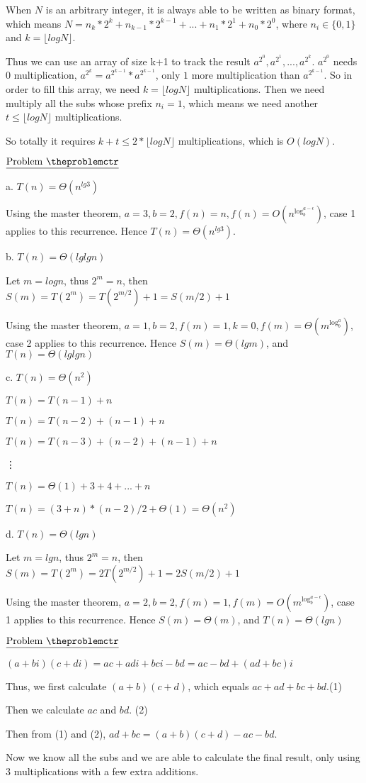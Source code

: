 \documentclass[11pt]{article}
\def\pp{\par\noindent}
\begin{document}
When $N$ is an arbitrary integer, it is always able to be written as binary format, which means $N=n_k*2^k+n_{k-1}*2^{k-1}+...+n_1*2^1+n_0*2^0$, where $n_i \in \{0,1\}$ and $k=\lfloor logN \rfloor$.

Thus we can use an array of size k+1 to track the result $a^{2^0}, a^{2^1}, ..., a^{2^k}$. $a^{2^0}$ needs $0$ multiplication, $a^{2^k} = a^{2^{k-1}}*a^{2^{k-1}}$, only $1$ more multiplication than $a^{2^{k-1}}$. So in order to fill this array, we need $k=\lfloor logN \rfloor$ multiplications. Then we need multiply all the subs whose prefix $n_i = 1$, which means we need another $t \le \lfloor logN \rfloor$ multiplications.

So totally it requires $k+t \le 2*\lfloor logN \rfloor$ multiplications, which is $O(logN)$.  

\vfill
\newpage
\addtocounter{problemctr}{1}
\bigskip
\noindent
$\underline{\rm Problem\ \theproblemctr}$\pp
\noindent 
a. $T(n)=\Theta(n^{lg3})$

Using the master theorem, $a=3, b=2, f(n)=n, f(n)=O(n^{\log_b^{a-\epsilon}})$, case 1 applies to this recurrence. Hence $T(n)=\Theta(n^{lg3})$.

\bigskip
\bigskip
\noindent
b. $T(n)=\Theta(lglgn)$

Let $m=logn$, thus $2^m=n$, then $S(m)=T(2^m)=T(2^{m/2})+1=S(m/2)+1$

Using the master theorem, $a=1, b=2, f(m)=1, k=0, f(m)=\Theta(m^{\log_b^{a}})$, case 2 applies to this recurrence. Hence $S(m)=\Theta(lgm)$, and $T(n)=\Theta(lglgn)$

\bigskip
\bigskip
\noindent
c. $T(n)=\Theta(n^2)$

$T(n)=T(n-1)+n$

$T(n)=T(n-2)+(n-1)+n$

$T(n)=T(n-3)+(n-2)+(n-1)+n$

\hspace{.5 cm} \vdots

$T(n)=\Theta(1)+3+4+...+n$

$T(n)=(3+n)*(n-2)/2+\Theta(1)=\Theta(n^2)$

\bigskip
\bigskip
\noindent
d. $T(n)=\Theta(lgn)$

Let $m=lgn$, thus $2^m=n$, then $S(m)=T(2^m)=2T(2^{m/2})+1=2S(m/2)+1$

Using the master theorem, $a=2, b=2, f(m)=1, f(m)=O(m^{\log_b^{a-\epsilon}})$, case 1 applies to this recurrence. Hence $S(m)=\Theta(m)$, and $T(n)=\Theta(lgn)$

\vfill
\newpage
\addtocounter{problemctr}{1}
\bigskip
\noindent
$\underline{\rm Problem\ \theproblemctr}$\pp

$(a + bi)(c + di)=ac+adi+bci-bd=ac-bd+(ad+bc)i$

Thus, we first calculate $(a+b)(c+d)$, which equals $ac+ad+bc+bd$.\hfill (1)

Then we calculate $ac$ and $bd$. \hfill (2)

Then from (1) and (2), $ad+bc=(a+b)(c+d)-ac-bd$.

Now we know all the subs and we are able to calculate the final result, only using 3 multiplications with a few extra additions.
  
\end{document}
